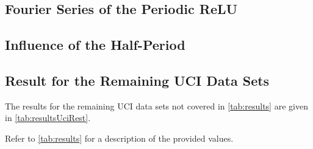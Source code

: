 \documentclass[11pt, a4paper, conference, romanappendices, twocolumn]{IEEEtran}
\begin{document}
	\appendix

	\subsection{Fourier Series of the Periodic \acs{ReLU}}  \label{app:perelu}
	

	\subsection{Influence of the Half-Period}  \label{app:halfPeriodInfluence}
	

	\subsection{Result for the Remaining \acs{UCI} Data Sets}  \label{app:remainingResults}
	The results for the remaining \ac{UCI} data sets not covered in \cref{tab:results} are given in \cref{tab:resultsUciRest}.
	\begin{table*}
		\centering
		\tabResultsUciRest
		\caption{Refer to \cref{tab:results} for a description of the provided values.}
		\label{tab:resultsUciRest}
	\end{table*}
\end{document}
